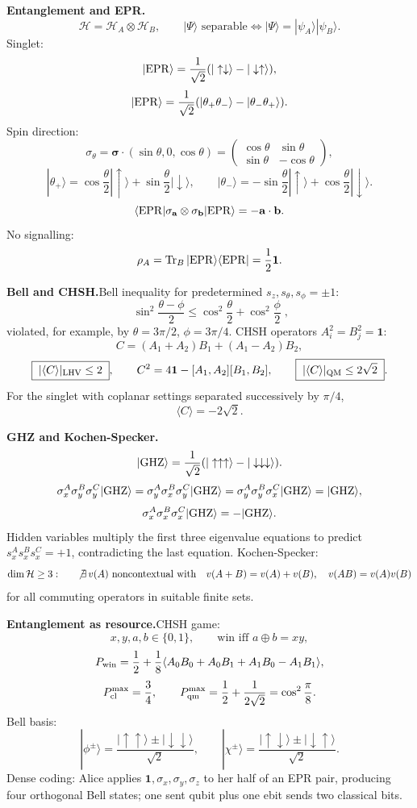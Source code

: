 \noindent\textbf{Entanglement and EPR.}\quad
\[
\mathcal H=\mathcal H_A\otimes\mathcal H_B,\qquad
|\Psi\rangle\text{ separable}\Longleftrightarrow
|\Psi\rangle=|\psi_A\rangle|\psi_B\rangle.
\]
Singlet:
\[
|{\rm EPR}\rangle=\frac1{\sqrt2}
(|\uparrow\downarrow\rangle-|\downarrow\uparrow\rangle),
\]
\[
|{\rm EPR}\rangle
=\frac1{\sqrt2}(|\theta_+\theta_-\rangle-|\theta_-\theta_+\rangle).
\]
Spin direction:
\[
\sigma_\theta=\bm{\sigma}\cdot(\sin\theta,0,\cos\theta)
=\begin{pmatrix}\cos\theta&\sin\theta\\ \sin\theta&-\cos\theta\end{pmatrix},
\]
\[
|\theta_+\rangle=\cos\frac{\theta}{2}|\uparrow\rangle
+\sin\frac{\theta}{2}|\downarrow\rangle,\qquad
|\theta_-\rangle=-\sin\frac{\theta}{2}|\uparrow\rangle
+\cos\frac{\theta}{2}|\downarrow\rangle.
\]
\[
\langle{\rm EPR}|\sigma_{\mathbf a}\otimes\sigma_{\mathbf b}|{\rm EPR}\rangle
=-\mathbf a\cdot\mathbf b.
\]
No signalling:
\[
\rho_A=\operatorname{Tr}_B|{\rm EPR}\rangle\langle{\rm EPR}|
=\frac12\mathbf{1}.
\]

\noindent\textbf{Bell and CHSH.}\quad Bell inequality for predetermined
$s_z,s_\theta,s_\phi=\pm1$:
\[
\boxed{\;\sin^2\frac{\theta-\phi}{2}\le
\cos^2\frac{\theta}{2}+\cos^2\frac{\phi}{2}\;},
\]
violated, for example, by $\theta=3\pi/2$, $\phi=3\pi/4$.
CHSH operators $A_i^2=B_j^2=\mathbf{1}$:
\[
C=(A_1+A_2)B_1+(A_1-A_2)B_2,
\]
\[
\boxed{\;|\langle C\rangle|_{\rm LHV}\le2\;},\qquad
C^2=4\mathbf{1}-[A_1,A_2][B_1,B_2],\qquad
\boxed{\;|\langle C\rangle|_{\rm QM}\le2\sqrt2\;}.
\]
For the singlet with coplanar settings separated successively by $\pi/4$,
\[
\langle C\rangle=-2\sqrt2.
\]

\noindent\textbf{GHZ and Kochen-Specker.}\quad
\[
|{\rm GHZ}\rangle=\frac1{\sqrt2}
(|\uparrow\uparrow\uparrow\rangle-|\downarrow\downarrow\downarrow\rangle).
\]
\[
\sigma_x^A\sigma_y^B\sigma_y^C|{\rm GHZ}\rangle
=\sigma_y^A\sigma_x^B\sigma_y^C|{\rm GHZ}\rangle
=\sigma_y^A\sigma_y^B\sigma_x^C|{\rm GHZ}\rangle
=|{\rm GHZ}\rangle,
\]
\[
\sigma_x^A\sigma_x^B\sigma_x^C|{\rm GHZ}\rangle=-|{\rm GHZ}\rangle.
\]
Hidden variables multiply the first three eigenvalue equations to predict
$s_x^As_x^Bs_x^C=+1$, contradicting the last equation.
Kochen-Specker:
\[
\dim\mathcal H\ge3:\qquad
\not\exists\,v(A)\ \text{noncontextual with}\quad
v(A+B)=v(A)+v(B),\quad v(AB)=v(A)v(B)
\]
for all commuting operators in suitable finite sets.

\noindent\textbf{Entanglement as resource.}\quad CHSH game:
\[
x,y,a,b\in\{0,1\},\qquad \text{win iff }a\oplus b=xy,
\]
\[
P_{\rm win}=\frac12+\frac18\langle A_0B_0+A_0B_1+A_1B_0-A_1B_1\rangle,
\]
\[
P_{\rm cl}^{\max}=\frac34,\qquad
P_{\rm qm}^{\max}=\frac12+\frac1{2\sqrt2}=\cos^2\frac{\pi}{8}.
\]
Bell basis:
\[
|\phi^\pm\rangle=\frac{|\uparrow\uparrow\rangle\pm|\downarrow\downarrow\rangle}{\sqrt2},
\qquad
|\chi^\pm\rangle=\frac{|\uparrow\downarrow\rangle\pm|\downarrow\uparrow\rangle}{\sqrt2}.
\]
Dense coding: Alice applies $\mathbf{1},\sigma_x,\sigma_y,\sigma_z$ to her half of an
EPR pair, producing four orthogonal Bell states; one sent qubit plus one ebit sends
two classical bits.

